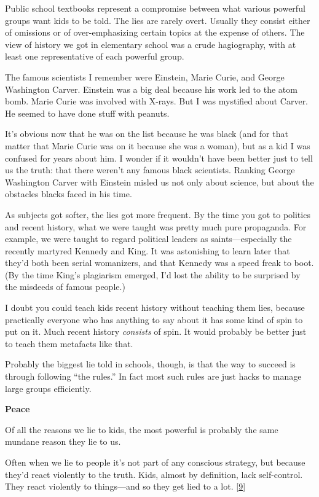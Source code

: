 Public school textbooks represent a compromise between what various
powerful groups want kids to be told. The lies are rarely overt. Usually
they consist either of omissions or of over-emphasizing certain topics
at the expense of others. The view of history we got in elementary
school was a crude hagiography, with at least one representative of each
powerful group.

The famous scientists I remember were Einstein, Marie Curie, and George
Washington Carver. Einstein was a big deal because his work led to the
atom bomb. Marie Curie was involved with X-rays. But I was mystified
about Carver. He seemed to have done stuff with peanuts.

It's obvious now that he was on the list because he was black (and for
that matter that Marie Curie was on it because she was a woman), but as
a kid I was confused for years about him. I wonder if it wouldn't have
been better just to tell us the truth: that there weren't any famous
black scientists. Ranking George Washington Carver with Einstein misled
us not only about science, but about the obstacles blacks faced in his
time.

As subjects got softer, the lies got more frequent. By the time you got
to politics and recent history, what we were taught was pretty much pure
propaganda. For example, we were taught to regard political leaders as
saints---especially the recently martyred Kennedy and King. It was
astonishing to learn later that they'd both been serial womanizers, and
that Kennedy was a speed freak to boot. (By the time King's plagiarism
emerged, I'd lost the ability to be surprised by the misdeeds of famous
people.)

I doubt you could teach kids recent history without teaching them lies,
because practically everyone who has anything to say about it has some
kind of spin to put on it. Much recent history \emph{consists} of spin.
It would probably be better just to teach them metafacts like that.

Probably the biggest lie told in schools, though, is that the way to
succeed is through following ``the rules.'' In fact most such rules are
just hacks to manage large groups efficiently.

\textbf{Peace}

Of all the reasons we lie to kids, the most powerful is probably the
same mundane reason they lie to us.

Often when we lie to people it's not part of any conscious strategy, but
because they'd react violently to the truth. Kids, almost by definition,
lack self-control. They react violently to things---and so they get lied
to a lot. {[}\hyperref[f9n]{9}{]}

